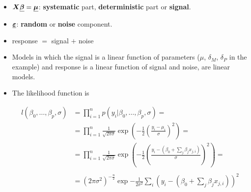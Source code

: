 \begin{frame}
  \begin{itemize}
    \vspace{0.5cm}
    \item $ \boldsymbol{X}\boldsymbol{\underline{\beta}} = \boldsymbol{\underline{\mu}} $: \textbf{systematic} part, \textbf{deterministic} part or \textbf{signal}. %
    \vspace{0.5cm}
    \item $ \boldsymbol{\underline{\varepsilon}} $: \textbf{random} or \textbf{noise} component.
    \vspace{0.5cm}
    \item response $ = $ signal $ + $ noise
    \vspace{0.5cm}
    \item Models in which the signal is a linear function of parameters ($ \mu $, $ \delta_M $, $ \delta_P $ in the example) and response is a linear function of signal and noise, are linear models.
  \end{itemize}
\end{frame}




\begin{frame}
  \begin{itemize}
    \vspace{0.5cm}
    \item The likelihood function is
     \begin{footnotesize}
       $$
          \begin{array}{rl} 
            l(\beta_0, \dots, \beta_p, \sigma) & = \displaystyle\prod_{i=1}^n p(y_i|\beta_0, \dots, \beta_p, \sigma) = \\  
            & = \displaystyle\prod_{i=1}^n \frac{1}{\sqrt{2\pi\sigma}} \exp{\left(-\frac{1}{2}\left(\frac{y_i-\mu_i}{\sigma}\right)^2\right)} = \\
            & = \displaystyle\prod_{i=1}^n \frac{1}{\sqrt{2\pi\sigma}} \exp{\left(-\frac{1}{2}\left(\frac{y_i-(\beta_0+\sum_j \beta_j x_{j,i})}{\sigma}\right)^2\right)} = \\
            & \\
            & = (2\pi\sigma^2)^{-\frac{n}{2}} \exp{-\frac{1}{2\sigma^2} \sum_i(y_i-(\beta_0+\sum_j \beta_j x_{j,i}))^2} \\
          \end{array}
      $$     
     \end{footnotesize}
  \end{itemize}
\end{frame}

